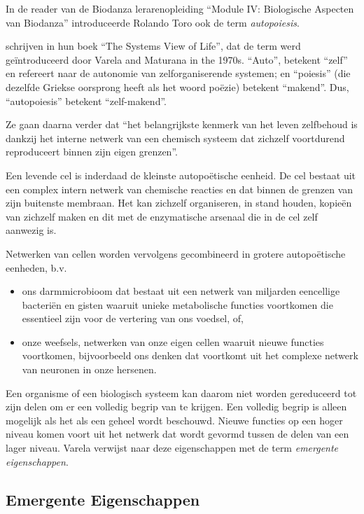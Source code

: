 \documentclass[
  11pt,
]{book}
\begin{document}
In de reader van de Biodanza lerarenopleiding ``Module IV: Biologische Aspecten van Biodanza'' introduceerde Rolando Toro ook de term \emph{autopoiesis}.

\citet{capraLuisi2014} schrijven in hun boek ``The Systems View of Life'', dat de term werd geïntroduceerd door Varela and Maturana in the 1970s. ``Auto'', betekent ``zelf'' en refereert naar de autonomie van zelforganiserende systemen; en ``poiesis'' (die dezelfde Griekse oorsprong heeft als het woord poëzie) betekent ``makend''. Dus, ``autopoiesis'' betekent ``zelf-makend''.

Ze gaan daarna verder dat ``het belangrijkste kenmerk van het leven zelfbehoud is dankzij het interne netwerk van een chemisch systeem dat zichzelf voortdurend reproduceert binnen zijn eigen grenzen''.

Een levende cel is inderdaad de kleinste autopoëtische eenheid. De cel bestaat uit een complex intern netwerk van chemische reacties en dat binnen de grenzen van zijn buitenste membraan. Het kan zichzelf organiseren, in stand houden, kopieën van zichzelf maken en dit met de enzymatische arsenaal die in de cel zelf aanwezig is.

Netwerken van cellen worden vervolgens gecombineerd in grotere autopoëtische eenheden, b.v.

\begin{itemize}
\item
  ons darmmicrobioom dat bestaat uit een netwerk van miljarden eencellige bacteriën en gisten waaruit unieke metabolische functies voortkomen die essentieel zijn voor de vertering van ons voedsel, of,
\item
  onze weefsels, netwerken van onze eigen cellen waaruit nieuwe functies voortkomen, bijvoorbeeld ons denken dat voortkomt uit het complexe netwerk van neuronen in onze hersenen.
\end{itemize}

Een organisme of een biologisch systeem kan daarom niet worden gereduceerd tot zijn delen om er een volledig begrip van te krijgen. Een volledig begrip is alleen mogelijk als het als een geheel wordt beschouwd. Nieuwe functies op een hoger niveau komen voort uit het netwerk dat wordt gevormd tussen de delen van een lager niveau. Varela verwijst naar deze eigenschappen met de term \emph{emergente eigenschappen}.

\hypertarget{emergente-eigenschappen}{%
\subsection{Emergente Eigenschappen}\label{emergente-eigenschappen}}
\end{document}
